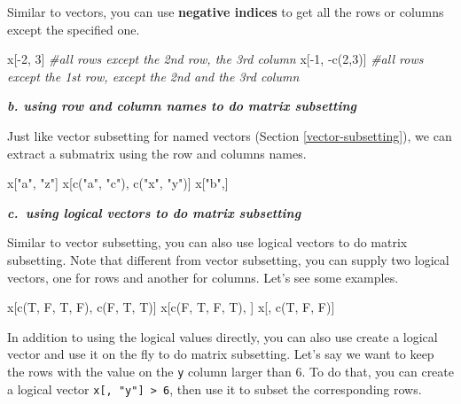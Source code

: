 \documentclass[
]{book}
\newenvironment{Shaded}{\begin{snugshade}}{\end{snugshade}}
\newcommand{\CommentTok}[1]{\textcolor[rgb]{0.56,0.35,0.01}{\textit{#1}}}
\newcommand{\DecValTok}[1]{\textcolor[rgb]{0.00,0.00,0.81}{#1}}
\newcommand{\FunctionTok}[1]{\textcolor[rgb]{0.00,0.00,0.00}{#1}}
\newcommand{\NormalTok}[1]{#1}
\newcommand{\SpecialCharTok}[1]{\textcolor[rgb]{0.00,0.00,0.00}{#1}}
\newcommand{\StringTok}[1]{\textcolor[rgb]{0.31,0.60,0.02}{#1}}
\begin{document}
Similar to vectors, you can use \textbf{negative indices} to get all the rows or columns except the specified one.

\begin{Shaded}
\begin{Highlighting}[]
\NormalTok{x[}\SpecialCharTok{{-}}\DecValTok{2}\NormalTok{, }\DecValTok{3}\NormalTok{]       }\CommentTok{\#all rows except the 2nd row, the 3rd column}
\NormalTok{x[}\SpecialCharTok{{-}}\DecValTok{1}\NormalTok{, }\SpecialCharTok{{-}}\FunctionTok{c}\NormalTok{(}\DecValTok{2}\NormalTok{,}\DecValTok{3}\NormalTok{)] }\CommentTok{\#all rows except the 1st row, except the 2nd and the 3rd column}
\end{Highlighting}
\end{Shaded}

\textbf{\emph{b. using row and column names to do matrix subsetting}}

Just like vector subsetting for named vectors (Section \ref{vector-subsetting}), we can extract a submatrix using the row and columns names.

\begin{Shaded}
\begin{Highlighting}[]
\NormalTok{x[}\StringTok{"a"}\NormalTok{, }\StringTok{"z"}\NormalTok{]}
\NormalTok{x[}\FunctionTok{c}\NormalTok{(}\StringTok{"a"}\NormalTok{, }\StringTok{"c"}\NormalTok{), }\FunctionTok{c}\NormalTok{(}\StringTok{"x"}\NormalTok{, }\StringTok{"y"}\NormalTok{)]}
\NormalTok{x[}\StringTok{"b"}\NormalTok{,]}
\end{Highlighting}
\end{Shaded}

\textbf{\emph{c.~using logical vectors to do matrix subsetting}}

Similar to vector subsetting, you can also use logical vectors to do matrix subsetting. Note that different from vector subsetting, you can supply two logical vectors, one for rows and another for columns. Let's see some examples.

\begin{Shaded}
\begin{Highlighting}[]
\NormalTok{x[}\FunctionTok{c}\NormalTok{(T, F, T, F), }\FunctionTok{c}\NormalTok{(F, T, T)]}
\NormalTok{x[}\FunctionTok{c}\NormalTok{(F, T, F, T), ]}
\NormalTok{x[, }\FunctionTok{c}\NormalTok{(T, F, F)]}
\end{Highlighting}
\end{Shaded}

In addition to using the logical values directly, you can also use create a logical vector and use it on the fly to do matrix subsetting. Let's say we want to keep the rows with the value on the \texttt{y} column larger than 6. To do that, you can create a logical vector \texttt{x{[},\ "y"{]}\ \textgreater{}\ 6}, then use it to subset the corresponding rows.
\end{document}
